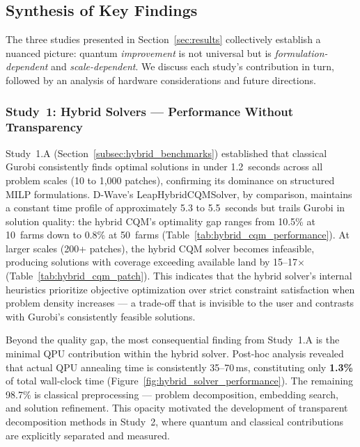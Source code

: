 \subsection{Synthesis of Key Findings}

The three studies presented in Section~\ref{sec:results} collectively establish a nuanced picture: quantum \textit{improvement} is not universal but is \textit{formulation-dependent} and \textit{scale-dependent}. We discuss each study's contribution in turn, followed by an analysis of hardware considerations and future directions.


\subsubsection{Study~1: Hybrid Solvers --- Performance Without Transparency}

Study~1.A (Section~\ref{subsec:hybrid_benchmarks}) established that classical Gurobi consistently finds optimal solutions in under 1.2~seconds across all problem scales (10 to 1,000 patches), confirming its dominance on structured MILP formulations. D-Wave's LeapHybridCQMSolver, by comparison, maintains a constant time profile of approximately 5.3 to 5.5~seconds but trails Gurobi in solution quality: the hybrid CQM's optimality gap ranges from 10.5\% at 10~farms down to 0.8\% at 50~farms (Table~\ref{tab:hybrid_cqm_performance}). At larger scales (200+ patches), the hybrid CQM solver becomes infeasible, producing solutions with coverage exceeding available land by 15--17$\times$ (Table~\ref{tab:hybrid_cqm_patch}). This indicates that the hybrid solver's internal heuristics prioritize objective optimization over strict constraint satisfaction when problem density increases --- a trade-off that is invisible to the user and contrasts with Gurobi's consistently feasible solutions.

Beyond the quality gap, the most consequential finding from Study~1.A is the minimal QPU contribution within the hybrid solver. Post-hoc analysis revealed that actual QPU annealing time is consistently 35--70\,ms, constituting only \textbf{1.3\%} of total wall-clock time (Figure~\ref{fig:hybrid_solver_performance}). The remaining 98.7\% is classical preprocessing --- problem decomposition, embedding search, and solution refinement. This opacity motivated the development of transparent decomposition methods in Study~2, where quantum and classical contributions are explicitly separated and measured.

